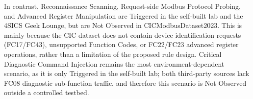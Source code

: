 In contrast, Reconnaissance Scanning, Request-side Modbus Protocol Probing, and Advanced Register Manipulation are Triggered in the self-built lab and the 4SICS Geek Lounge, but are Not Observed in CICModbusDataset2023. This is mainly because the CIC dataset does not contain device identification requests (FC17/FC43), unsupported Function Codes, or FC22/FC23 advanced register operations, rather than a limitation of the proposed rule design. Critical Diagnostic Command Injection remains the most environment-dependent scenario, as it is only Triggered in the self-built lab; both third-party sources lack FC08 diagnostic sub-function traffic, and therefore this scenario is Not Observed outside a controlled testbed.
\newpage
\begin{table}[htbp]
\caption{Third-party Dataset Mapping for Scenario-based Detection Rules}
\centering
\footnotesize
\renewcommand{\arraystretch}{1.5}

\end{table}
